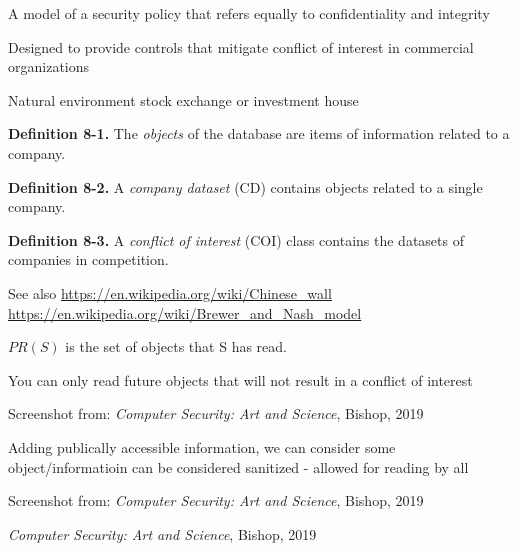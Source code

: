 \documentclass[Screen16to9,17pt]{foils}
\begin{document}


\begin{list1}
\item A model of a security policy that refers equally to confidentiality and integrity
\item Designed to provide controls that mitigate conflict of interest in commercial organizations
\item Natural environment stock exchange or investment house
\item {\bf Definition 8-1.} The \emph{objects} of the database are items of information related to a company.
\item {\bf Definition 8-2.} A \emph{company dataset} (CD) contains objects related to a single company.
\item {\bf Definition 8-3.} A \emph{conflict of interest} (COI) class contains the datasets of companies in competition.
\item
\item
\end{list1}

See also
\url{https://en.wikipedia.org/wiki/Chinese_wall}\\
\url{https://en.wikipedia.org/wiki/Brewer_and_Nash_model}


$P R(S)$ is the set of objects that S has read.


You can only read future objects that will not result in a conflict of interest

Screenshot from:
\emph{Computer Security: Art and Science}, Bishop, 2019



Adding publically accessible information, we can consider some object/informatioin can be considered sanitized - allowed for reading by all

Screenshot from:
\emph{Computer Security: Art and Science}, Bishop, 2019




\emph{Computer Security: Art and Science}, Bishop, 2019


\end{document}
